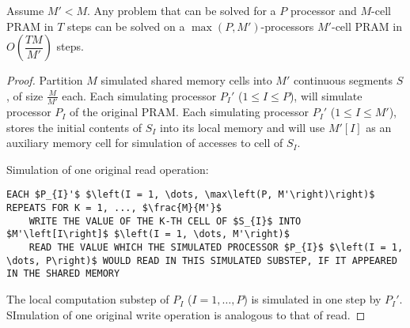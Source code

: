 \highspace
\begin{lemma}
    Assume $M' < M$. Any problem that can be solved for a $P$ processor and $M$-cell PRAM in $T$ steps can be solved on a $\max\left(P, M'\right)$-processors $M'$-cell PRAM in $O\left(\dfrac{TM}{M'}\right)$ steps.
\end{lemma}
\begin{proof}
    Partition $M$ simulated shared memory cells into $M'$ continuous segments $S$, of size $\frac{M}{M'}$ each. Each simulating processor $P_{I}'$ ($1 \le I \le P$), will simulate processor $P_{I}$ of the original PRAM. Each simulating processor $P_{I}'$ ($1 \le I \le M'$), stores the initial contents of $S_{I}$ into its local memory and will use $M'\left[I\right]$ as an auxiliary memory cell for simulation of accesses to cell of $S_{I}$.

    \noindent
    Simulation of one original read operation:
    \begin{lstlisting}[mathescape=true]
EACH $P_{I}'$ $\left(I = 1, \dots, \max\left(P, M'\right)\right)$ REPEATS FOR K = 1, ..., $\frac{M}{M'}$
    WRITE THE VALUE OF THE K-TH CELL OF $S_{I}$ INTO $M'\left[I\right]$ $\left(I = 1, \dots, M'\right)$
    READ THE VALUE WHICH THE SIMULATED PROCESSOR $P_{I}$ $\left(I = 1, \dots, P\right)$ WOULD READ IN THIS SIMULATED SUBSTEP, IF IT APPEARED IN THE SHARED MEMORY\end{lstlisting}
    The local computation substep of $P_{I}$ ($I = 1, \dots, P$) is simulated in one step by $P_{I}'$. SImulation of one original write operation is analogous to that of read.
\end{proof}
